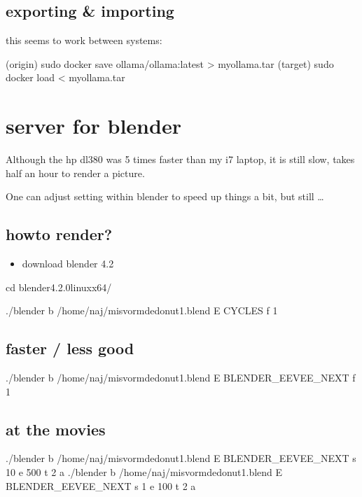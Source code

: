 \documentclass[letterpaper,10pt,english]{sphinxmanual}
\begin{document}
\section{exporting \& importing}
\label{\detokenize{portainer:exporting-importing}}
\sphinxAtStartPar
this seems to work between systems:

\sphinxAtStartPar
(origin) sudo docker save ollama/ollama:latest  \textgreater{} my\sphinxhyphen{}ollama.tar
(target) sudo docker load \textless{} my\sphinxhyphen{}ollama.tar

\sphinxstepscope


\chapter{server for blender}
\label{\detokenize{blender:server-for-blender}}\label{\detokenize{blender::doc}}
\sphinxAtStartPar
Although the hp dl380 was 5 times faster than my i7 laptop, it is still slow, takes half an hour to render a picture.

\sphinxAtStartPar
One can adjust setting within blender to speed up things a bit, but still …


\section{howto render?}
\label{\detokenize{blender:howto-render}}\begin{itemize}
\item {} 
\sphinxAtStartPar
download blender 4.2

\end{itemize}

\sphinxAtStartPar
cd blender\sphinxhyphen{}4.2.0\sphinxhyphen{}linux\sphinxhyphen{}x64/

\sphinxAtStartPar
./blender \sphinxhyphen{}b /home/naj/misvormde\sphinxhyphen{}donut1.blend \sphinxhyphen{}E CYCLES \sphinxhyphen{}f 1


\section{faster / less good}
\label{\detokenize{blender:faster-less-good}}
\sphinxAtStartPar
./blender \sphinxhyphen{}b /home/naj/misvormde\sphinxhyphen{}donut1.blend \sphinxhyphen{}E BLENDER\_EEVEE\_NEXT \sphinxhyphen{}f 1


\section{at the movies}
\label{\detokenize{blender:at-the-movies}}
\sphinxAtStartPar
./blender \sphinxhyphen{}b /home/naj/misvormde\sphinxhyphen{}donut1.blend \sphinxhyphen{}E BLENDER\_EEVEE\_NEXT \sphinxhyphen{}s 10 \sphinxhyphen{}e 500 \sphinxhyphen{}t 2 \sphinxhyphen{}a
./blender \sphinxhyphen{}b /home/naj/misvormde\sphinxhyphen{}donut1.blend \sphinxhyphen{}E BLENDER\_EEVEE\_NEXT \sphinxhyphen{}s 1 \sphinxhyphen{}e 100 \sphinxhyphen{}t 2 \sphinxhyphen{}a
\end{document}
